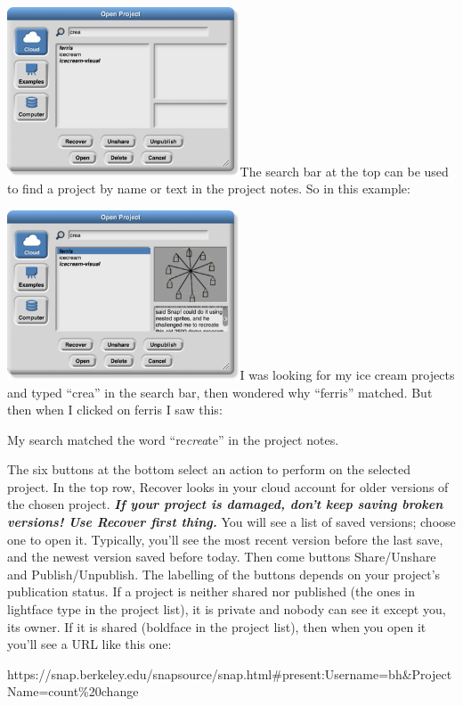 \includegraphics[width=2.72431in,height=1.97778in]{media/image996.png}The
search bar at the top can be used to find a project by name or text in
the project notes. So in this example:

\includegraphics[width=2.72361in,height=1.97778in]{media/image997.png}I
was looking for my ice cream projects and typed ``crea'' in the search
bar, then wondered why ``ferris'' matched. But then when I clicked on
ferris I saw this:

My search matched the word ``re\emph{crea}te'' in the project notes.

The six buttons at the bottom select an action to perform on the
selected project. In the top row, Recover looks in your cloud account
for older versions of the chosen project. \emph{\textbf{If your project
is damaged, don't keep saving broken versions! Use Recover first
thing.}} You will see a list of saved versions; choose one to open it.
Typically, you'll see the most recent version before the last save, and
the newest version saved before today. Then come buttons Share/Unshare
and Publish/Unpublish. The labelling of the buttons depends on your
project's publication status. If a project is neither shared nor
published (the ones in lightface type in the project list), it is
private and nobody can see it except you, its owner. If it is shared
(boldface in the project list), then when you open it you'll see a URL
like this one:

https://snap.berkeley.edu/snapsource/snap.html\#present:Username=bh\&ProjectName=count\%20change

